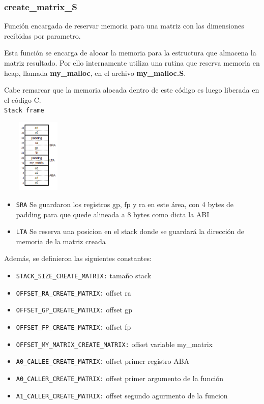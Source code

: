 \documentclass[a4paper,10pt, spanish]{article}
\begin{document}
\subsubsection{create\_matrix\_S}
    Función encargada de reservar memoria para una matriz con las dimensiones recibidas por parametro.
    
    Esta función se encarga de alocar la memoria para la estructura que almacena la matriz resultado. Por ello internamente utiliza una rutina que reserva memoria en heap, llamada \textbf{my\_malloc}, en el archivo \textbf{my\_malloc.S}. 
    
    Cabe remarcar que la memoria alocada dentro de este código es luego liberada en el código C.\\
    \lstinline{Stack frame} \\
            \begin{center}
              \includegraphics[max height=100pt,max width=100pt]{./stack_create_matrix.png}
            \end{center}
            \begin{itemize}
                \item \lstinline{SRA}
                Se guardaron los registros gp, fp y ra en este área, con 4 bytes de padding para que quede alineada a 8 bytes como dicta la ABI
                \item \lstinline{LTA}
                Se reserva una posicion en el stack donde se guardará la dirección de memoria de la matriz creada
            \end{itemize}
     Además, se definieron las siguientes constantes:
        \begin{itemize}
            \item \lstinline{STACK_SIZE_CREATE_MATRIX:} tamaño stack
            \item \lstinline{OFFSET_RA_CREATE_MATRIX:} offset ra
            \item \lstinline{OFFSET_GP_CREATE_MATRIX:} offset gp
            \item \lstinline{OFFSET_FP_CREATE_MATRIX:} offset fp
            \item \lstinline{OFFSET_MY_MATRIX_CREATE_MATRIX:} offset variable my\_matrix
            \item \lstinline{A0_CALLEE_CREATE_MATRIX:} offset primer registro ABA
            \item \lstinline{A0_CALLER_CREATE_MATRIX:} offset primer argumento de la función
            \item \lstinline{A1_CALLER_CREATE_MATRIX:} offset segundo agurmento de la funcion
        \end{itemize}
\end{document}
